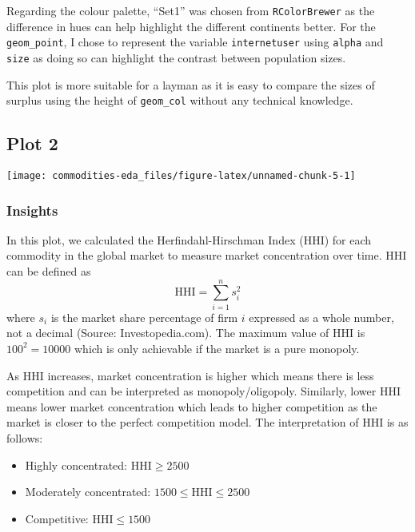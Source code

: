 \documentclass[
]{article}
\providecommand{\tightlist}{%
  \setlength{\itemsep}{0pt}\setlength{\parskip}{0pt}}
\begin{document}
Regarding the colour palette, ``Set1'' was chosen from
\texttt{RColorBrewer} as the difference in hues can help highlight the
different continents better. For the \texttt{geom\_point}, I chose to
represent the variable \texttt{internetuser} using \texttt{alpha} and
\texttt{size} as doing so can highlight the contrast between population
sizes.

This plot is more suitable for a layman as it is easy to compare the
sizes of surplus using the height of \texttt{geom\_col} without any
technical knowledge.

\hypertarget{plot-2}{%
\subsection{Plot 2}\label{plot-2}}

\begin{center}\texttt{[image: commodities-eda\_files/figure-latex/unnamed-chunk-5-1]} \end{center}

\hypertarget{insights-1}{%
\subsubsection{Insights}\label{insights-1}}

In this plot, we calculated the Herfindahl-Hirschman Index (HHI) for
each commodity in the global market to measure market concentration over
time. HHI can be defined as \[\text{HHI} = \sum_{i=1}^ns_i^2\] where
\(s_i\) is the market share percentage of firm \(i\) expressed as a
whole number, not a decimal (Source: Investopedia.com). The maximum
value of HHI is \(100^2 = 10000\) which is only achievable if the market
is a pure monopoly.

As HHI increases, market concentration is higher which means there is
less competition and can be interpreted as monopoly/oligopoly.
Similarly, lower HHI means lower market concentration which leads to
higher competition as the market is closer to the perfect competition
model. The interpretation of HHI is as follows:

\begin{itemize}
\tightlist
\item
  Highly concentrated: \(\text{HHI} \geq 2500\)
\item
  Moderately concentrated: \(1500 \leq \text{HHI} \leq 2500\)
\item
  Competitive: \(\text{HHI} \leq 1500\)
\end{itemize}
\end{document}
